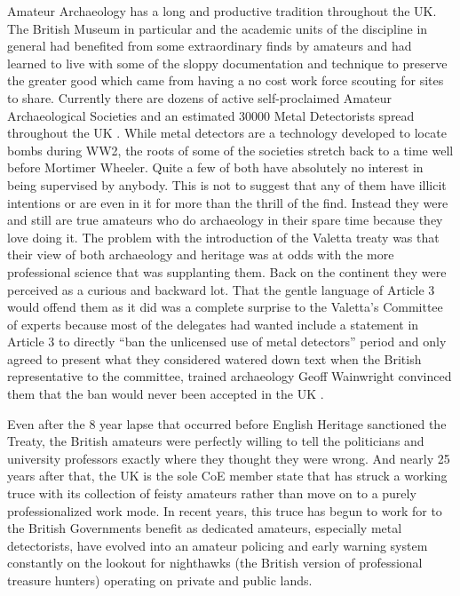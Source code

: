 Amateur Archaeology has a long and productive tradition throughout the UK. The British Museum in particular and the academic units of the discipline in general had benefited from some extraordinary finds by amateurs and had learned to live with some of the sloppy documentation and technique to preserve the greater good which came from having a no cost work force scouting for sites to share. Currently there are dozens of active self-proclaimed Amateur Archaeological Societies and an estimated \num{30000} 
Metal Detectorists spread throughout the UK \parencites{finlo2006}{potts2015}. %
While metal detectors are a technology developed to locate bombs during WW2, the roots of some of the societies stretch back to a time well before Mortimer Wheeler. Quite a few of both have absolutely no interest in being supervised by anybody. This is not to suggest that any of them have illicit intentions or are even in it for more than the thrill of the find. Instead they were and still are true amateurs who do archaeology in their spare time because they love doing it. The problem with the introduction of the Valetta treaty was that their view of both archaeology and heritage was at odds with the more professional science that was supplanting them. Back on the continent they were perceived as a curious and backward lot. That the gentle language of Article 3 would offend them as it did was a complete surprise to the Valetta’s Committee of experts because most of the delegates had wanted include a statement in Article 3 to directly “ban the unlicensed use of metal detectors” period and only agreed to present what they considered watered down text when the British representative to the committee, trained archaeology Geoff Wainwright convinced them that the ban would never been accepted in the UK \parencite[62]{willems2007}. 

Even after the \num{8} year lapse that occurred before English Heritage sanctioned the Treaty, the British amateurs were perfectly willing to tell the politicians and university professors exactly where they thought they were wrong. And nearly \num{25} years after that, the UK is the sole CoE member state that has struck a working truce with its collection of feisty amateurs rather than move on to a purely professionalized work mode. In recent years, this truce has begun to work for to the British Governments benefit as dedicated amateurs, especially metal detectorists, have evolved into an amateur policing and early warning system constantly on the lookout for nighthawks (the British version of professional treasure hunters) operating on private and public lands. 

